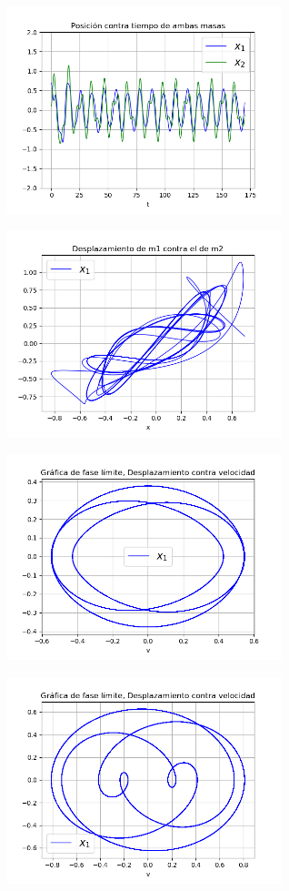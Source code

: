 \documentclass[a4paper]{article}
\begin{document}
\begin{center}
\includegraphics[height=6cm]{ejemplo4-1.png}

\includegraphics[height=6cm]{recta4-1.png}

\includegraphics[height=6cm]{circulo4-1-1l.png}

\includegraphics[height=6cm]{circulo4-1-2l.png}
\end{center}
\end{document}
